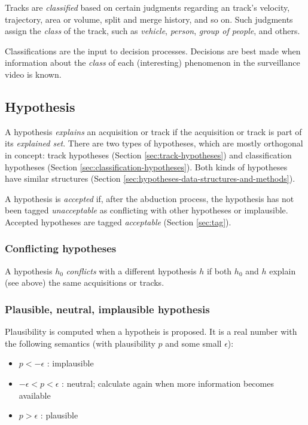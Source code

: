 \documentclass{book}
\begin{document}
Tracks are \emph{classified} based on certain judgments regarding an track's
velocity, trajectory, area or volume, split and merge history, and so on. Such
judgments assign the \emph{class} of the track, such as \emph{vehicle},
\emph{person}, \emph{group of people}, and others.

Classifications are the input to decision processes. Decisions are best made
when information about the \emph{class} of each (interesting) phenomenon in the
surveillance video is known.

\subsection{Hypothesis}
\label{sec:hypothesis}

A hypothesis \emph{explains} an acquisition or track if the acquisition or track
is part of its \emph{explained set}. There are two types of hypotheses, which
are mostly orthogonal in concept: track hypotheses (Section
\ref{sec:track-hypotheses}) and classification hypotheses (Section
\ref{sec:classification-hypotheses}). Both kinds of hypotheses have similar
structures (Section \ref{sec:hypotheses-data-structures-and-methods}).

A hypothesis is \emph{accepted} if, after the abduction process, the hypothesis
has not been tagged \emph{unacceptable} as conflicting with other hypotheses or
implausible. Accepted hypotheses are tagged \emph{acceptable} (Section
\ref{sec:tag}).

\subsubsection{Conflicting hypotheses}
\label{sec:conflicting-hypotheses}

A hypothesis $h_0$ \emph{conflicts} with a different hypothesis $h$ if both
$h_0$ and $h$ explain (see above) the same acquisitions or tracks.

\subsubsection{Plausible, neutral, implausible hypothesis}
\label{sec:plausibility}

Plausibility is computed when a hypotheis is proposed. It is a real number with
the following semantics (with plausibility $p$ and some small $\epsilon$):
\begin{itemize}
    \item $p < -\epsilon$ : implausible
    \item $-\epsilon < p < \epsilon$ : neutral; calculate again when more
        information becomes available
    \item $p > \epsilon$ : plausible
\end{itemize}
\end{document}
